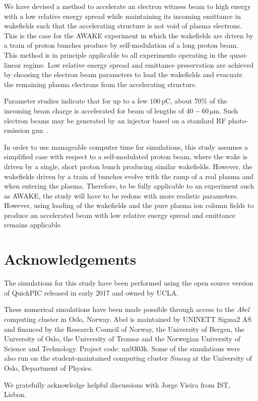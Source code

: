 \documentclass[aps,prstab,reprint,amsmath,amssymb,groupedaddress]{revtex4-1}
\newcommand{\unit}[1]{\,\mathrm{#1}}
\begin{document}
We have devised a method to accelerate an electron witness beam to high energy with a low relative energy spread while maintaining its incoming emittance in wakefields such that the accelerating structure is not void of plasma electrons. This is the case for the AWAKE experiment in which the wakefields are driven by a train of proton bunches produce by self-modulation of a long proton beam. This method is in principle applicable to all experiments operating in the quasi-linear regime. Low relative energy spread and emittance preservation are achieved by choosing the electron beam parameters to load the wakefields and evacuate the remaining plasma electrons from the accelerating structure.
 
Parameter studies indicate that for up to a few $100\unit{pC}$, about $70\%$ of the incoming beam charge is accelerated for beam of lengths of $40-60\unit{\mu m}$. Such electron beams may be generated by an injector based on a standard RF photo-emission gun~\cite{doebert:corr}.

In order to use manageable computer time for simulations, this study assumes a simplified case with respect to a self-modulated proton beam, where the wake is driven by a single, short proton bunch producing similar wakefields. However, the wakefields driven by a train of bunches evolve with the ramp of a real plasma and when entering the plasma. Therefore, to be fully applicable to an experiment such as AWAKE, the study will have to be redone with more realistic parameters. However, using loading of the wakefields and the pure plasma ion column fields to produce an accelerated beam with low relative energy spread and emittance remains applicable.

\section{Acknowledgements}\label{Ack}

The simulations for this study have been performed using the open source version of QuickPIC released in early 2017 and owned by UCLA.

These numerical simulations have been made possible through access to the \emph{Abel} computing cluster in Oslo, Norway. Abel is maintained by UNINETT Sigma2 AS and financed by the Research Council of Norway, the University of Bergen, the University of Oslo, the University of Troms{\o} and the Norwegian University of Science and Technology. Project code: nn9303k. Some of the simulations were also run on the student-maintained computing cluster \emph{Smaug} at the University of Oslo, Department of Physics.

We gratefully acknowledge helpful discussions with Jorge Vieira from IST, Lisbon.
\vfill


\end{document}
